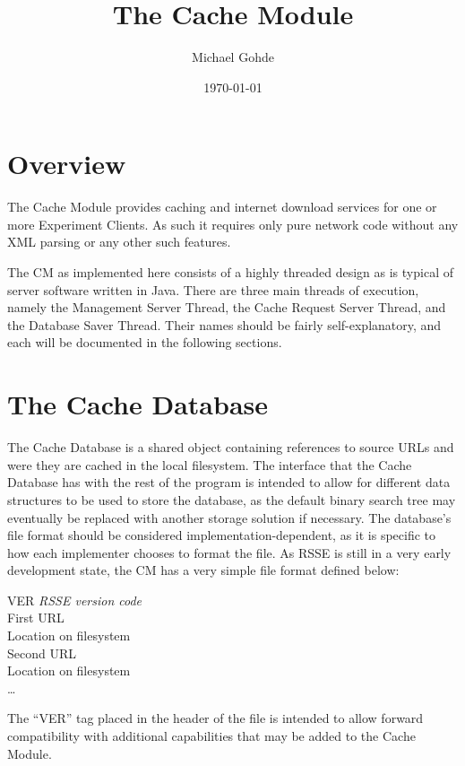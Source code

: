 \documentclass[letterpaper]{article}
\begin{document}
\title{The Cache Module}
\author{Michael Gohde}
\date{\today}
\maketitle

\section{Overview}
The Cache Module provides caching and internet download services for one or more Experiment Clients. As such it requires only pure network code without any XML parsing or any other such features.

The CM as implemented here consists of a highly threaded design as is typical of server software written in Java. There are three main threads of execution, namely the Management Server Thread, the Cache Request Server Thread, and the Database Saver Thread. Their names should be fairly self-explanatory, and each will be documented in the following sections.

\section{The Cache Database}
The Cache Database is a shared object containing references to source URLs and were they are cached in the local filesystem. The interface that the Cache Database has with the rest of the program is intended to allow for different data structures to be used to store the database, as the default binary search tree may eventually be replaced with another storage solution if necessary. The database's file format should be considered implementation-dependent, as it is specific to how each implementer chooses to format the file. As RSSE is still in a very early development state, the CM has a very simple file format defined below:
\\
\begin{addmargin}[1em]{2em}
VER \textit{RSSE version code}\\
First URL\\
Location on filesystem\\
Second URL\\
Location on filesystem\\
\ldots\\
\end{addmargin}

The ``VER'' tag placed in the header of the file is intended to allow forward compatibility with additional capabilities that may be added to the Cache Module.
\end{document}

